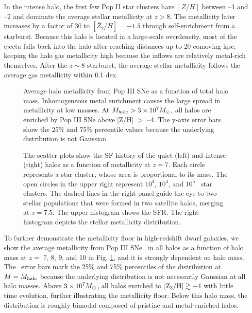 \documentclass[apjl]{emulateapj}
\begin{document}
In the intense halo, the first few Pop II star clusters have $[Z/H]$
between --1 and --2 and dominate the average stellar metallicity at $z
> 8$.  The metallicity later increases by a factor of 30 to
$[\bar{Z}_2/H] = -1.5$ through self-enrichment from a starburst.
Because this halo is located in a large-scale overdensity, most of the
ejecta falls back into the halo after reaching distances up to 20
comoving kpc, keeping the halo gas metallicity high because the
inflows are relatively metal-rich themselves.  After the $z \sim 8$
starburst, the average stellar metallicity follows the average gas
metallicity within 0.1 dex.


\begin{figure}
\caption{\label{fig:z3} Average halo metallicity from Pop III SNe as a
  function of total halo mass.  Inhomogeneous metal enrichment causes
  the large spread in metallicity at low masses.  At $M_{\rm halo} > 3
  \times 10^7 \Ms$, all halos are enriched by Pop III SNe above [Z/H]
  $>$ --4.  The y-axis error bars show the 25\% and 75\% percentile
  values because the underlying distribution is not Gaussian.}
\end{figure}



\begin{figure*}
\caption{\label{fig:pops} The scatter plots show the SF history of the
  quiet (left) and intense (right) halos as a function of metallicity
  at $z=7$.  Each circle represents a star cluster, whose area is
  proportional to its mass.  The open circles in the upper right
  represent $10^3$, $10^4$, and $10^5$ \Ms~star clusters.  The dashed
  lines in the right panel guide the eye to two stellar populations
  that were formed in two satellite halos, merging at $z=7.5$.  The
  upper histogram shows the SFR.  The right histogram depicts the
  stellar metallicity distribution.}
\end{figure*}


To further demonstrate the metallicity floor in high-redshift dwarf
galaxies, we show the average metallicity from Pop III SNe \zthree~in
all halos as a function of halo mass at $z =$ 7, 8, 9, and 10 in
Fig. \ref{fig:z3}, and it is strongly dependent on halo mass.  The
\zthree~error bars mark the 25\% and 75\% percentiles of the
distribution at $M = M_{\rm halo}$ because the underlying distribution
is not necessarily Gaussian at all halo masses.  Above $3 \times 10^7
\Ms$, all halos enriched to $\zthree \ga -4$ with little time
evolution, further illustrating the metallicity floor.  Below this
halo mass, the distribution is roughly bimodal composed of pristine
and metal-enriched halos.
\end{document}
